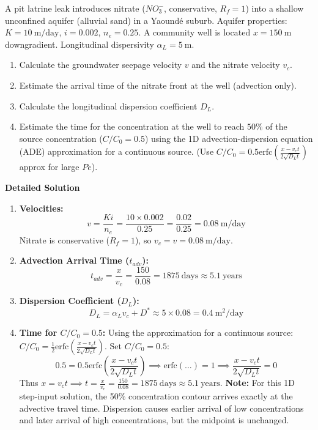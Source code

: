 \documentclass[11pt]{article}
\begin{document}
\begin{exoresolu}
A pit latrine leak introduces nitrate ($NO_3^-$, conservative, $R_f=1$) into a shallow unconfined aquifer (alluvial sand) in a Yaoundé suburb.
Aquifer properties: $K = 10\ \mathrm{m/day}$, $i = 0.002$, $n_e = 0.25$.
A community well is located $x = 150\ \mathrm{m}$ downgradient.
Longitudinal dispersivity $\alpha_L = 5\ \mathrm{m}$.
\begin{enumerate}
    \item Calculate the groundwater seepage velocity $v$ and the nitrate velocity $v_c$.
    \item Estimate the arrival time of the nitrate front at the well (advection only).
    \item Calculate the longitudinal dispersion coefficient $D_L$.
    \item Estimate the time for the concentration at the well to reach $50\%$ of the source concentration ($C/C_0 = 0.5$) using the 1D advection-dispersion equation (ADE) approximation for a continuous source. (Use $C/C_0 = 0.5 \text{erfc}(\frac{x-v_c t}{2\sqrt{D_L t}})$ approx for large $Pe$).
\end{enumerate}
\tcblower
\textbf{Detailed Solution}
\begin{enumerate}
    \item \textbf{Velocities:}
    \[ v = \frac{K i}{n_e} = \frac{10 \times 0.002}{0.25} = \frac{0.02}{0.25} = \mathbf{0.08\ \mathrm{m/day}} \]
    Nitrate is conservative ($R_f = 1$), so $v_c = v = \mathbf{0.08\ \mathrm{m/day}}$.
    \item \textbf{Advection Arrival Time ($t_{adv}$):}
    \[ t_{adv} = \frac{x}{v_c} = \frac{150}{0.08} = 1875\ \mathrm{days} \approx \mathbf{5.1\ \mathrm{years}} \]
    \item \textbf{Dispersion Coefficient ($D_L$):}
    \[ D_L = \alpha_L v_c + D^* \approx 5 \times 0.08 = \mathbf{0.4\ \mathrm{m^2/day}} \]
    \item \textbf{Time for $C/C_0 = 0.5$:}
    Using the approximation for a continuous source: $C/C_0 = \frac{1}{2} \text{erfc}\left(\frac{x - v_c t}{2\sqrt{D_L t}}\right)$.
    Set $C/C_0 = 0.5$:
    \[ 0.5 = 0.5 \text{erfc}\left(\frac{x - v_c t}{2\sqrt{D_L t}}\right) \implies \text{erfc}(\dots) = 1 \implies \frac{x - v_c t}{2\sqrt{D_L t}} = 0 \]
    Thus $x = v_c t \implies t = \frac{x}{v_c} = \frac{150}{0.08} = 1875\ \mathrm{days} \approx \mathbf{5.1\ \mathrm{years}}$.
    \textbf{Note:} For this 1D step-input solution, the 50\% concentration contour arrives exactly at the advective travel time. Dispersion causes earlier arrival of low concentrations and later arrival of high concentrations, but the midpoint is unchanged.
\end{enumerate}
\end{exoresolu}
\end{document}
